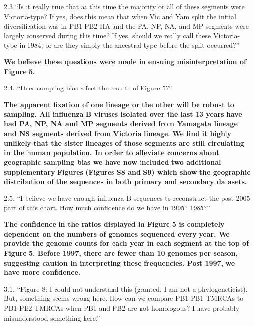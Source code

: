\documentclass[11pt,oneside,letterpaper]{article}
\begin{document}
2.3 ``Is it really true that at this time the majority or all of these segments were Victoria-type?
If yes, does this mean that when Vic and Yam split the initial diversification was in PB1-PB2-HA and the PA, NP, NA, and MP segments were largely conserved during this time?
If yes, should we really call these Victoria-type in 1984, or are they simply the ancestral type before the split occurred?''

\textbf{We believe these questions were made in ensuing misinterpretation of Figure 5.}

2.4. ``Does sampling bias affect the results of Figure 5?''

\textbf{The apparent fixation of one lineage or the other will be robust to sampling.
All influenza B viruses isolated over the last 13 years have had PA, NP, NA and MP segments derived from Yamagata lineage and NS segments derived from Victoria lineage.
We find it highly unlikely that the sister lineages of those segments are still circulating in the human population.
In order to alleviate concerns about geographic sampling bias we have now included two additional supplementary Figures (Figures S8 and S9) which show the geographic distribution of the sequences in both primary and secondary datasets.}

2.5. ``I believe we have enough influenza B sequences to reconstruct the post-2005 part of this chart. How much confidence do we have in 1995? 1985?''

\textbf{The confidence in the ratios displayed in Figure 5 is completely dependent on the numbers of genomes sequenced every year.
We provide the genome counts for each year in each segment at the top of Figure 5.
Before 1997, there are fewer than 10 genomes per season, suggesting caution in interpreting these frequencies.
Post 1997, we have more confidence.}

3.1. ``Figure 8:  I could not understand this (granted, I am not a phylogeneticist).
But, something seems wrong here.
How can we compare PB1-PB1 TMRCAs to PB1-PB2 TMRCAs when PB1 and PB2 are not homologous?
I have probably misunderstood something here.''
\end{document}
